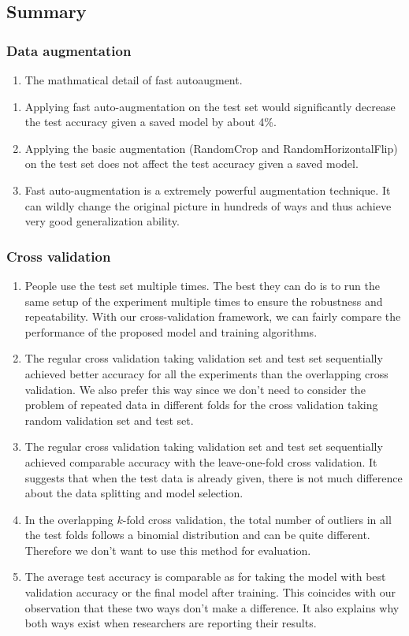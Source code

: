 \subsection{Summary}

\subsubsection{Data augmentation}
\begin{enumerate}
\item The mathmatical detail of fast autoaugment.
\end{enumerate}

\begin{enumerate}
\item Applying fast auto-augmentation on the test set would significantly decrease the test accuracy given a saved model by about 4\%.
\item Applying the basic augmentation (RandomCrop and RandomHorizontalFlip) on the test set does not affect the test accuracy given a saved model. 
\item Fast auto-augmentation is a extremely powerful augmentation technique. It can wildly change the original picture in hundreds of ways and thus achieve very good generalization ability.
\end{enumerate}
\subsubsection{Cross validation}
\begin{enumerate}
\item People use the test set multiple times. The best they can do is to run the same setup of the experiment multiple times to ensure the robustness and repeatability. With our cross-validation framework, we can fairly compare the performance of the proposed model and training algorithms.
\item The regular cross validation taking validation set and test set sequentially achieved better accuracy for all the experiments than the overlapping cross validation. We also prefer this way since we don't need to consider the problem of repeated data in different folds for the cross validation taking random validation set and test set.
\item The regular cross validation taking validation set and test set sequentially achieved comparable  accuracy with the leave-one-fold cross validation. It suggests that when the test data is already given, there is not much difference about the data splitting and model selection.
\item In the overlapping $k$-fold cross validation, the total number of outliers in all the test folds follows a binomial distribution and can be quite different. Therefore we don't want to use this method for evaluation.
\item The average test accuracy is comparable as for taking the model with best validation accuracy or the final model after training. This coincides with our observation that these two ways don't make a difference. It also explains why both ways exist when researchers are reporting their results.
\end{enumerate}
